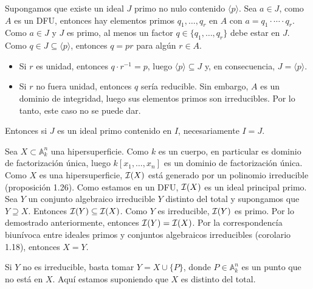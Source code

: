 \documentclass[twoside]{article}
\begin{document}
\begin{solucion}
Supongamos que existe un ideal $J$ primo no nulo contenido $\langle p \rangle$. Sea $a \in J$, como $A$ es un DFU, entonces hay elementos primos $q_1,\dots, q_r$ en $A$ con $a=q_1\cdot \cdots \cdot q_r$. Como $a \in J$ y $J$ es primo, al menos un factor $q \in \{q_1,\dots,q_r\}$ debe estar en $J$. Como $q \in J \subseteq \langle p\rangle$, entonces $q=pr$ para algún $r \in A$.
\begin{itemize}
	\item Si $r$ es unidad, entonces $q\cdot r^{-1} = p$, luego $\langle p \rangle \subseteq J$ y, en consecuencia, $J = \langle p \rangle$.
	\item Si $r$ no fuera unidad, entonces $q$ sería reducible. Sin embargo, $A$ es un dominio de integridad, luego sus elementos primos son irreducibles. Por lo tanto, este caso no se puede dar.
\end{itemize}
Entonces si $J$ es un ideal primo contenido en $I$, necesariamente $I = J$.

Sea $X \subset \mathbb{A}_k^n$ una hipersuperficie. Como $k$ es un cuerpo, en particular es dominio de factorización única, luego $k[x_1,\dots,x_n]$ es un dominio de factorización única. Como $X$ es una hipersuperficie, $\mathcal{I}(X)$ está generado por un polinomio irreducible (proposición 1.26). Como estamos en un DFU, $\mathcal{I}(X)$ es un ideal principal primo. Sea $Y$ un conjunto algebraico irreducible $Y$ distinto del total y supongamos que $Y \supseteq X$. Entonces $\mathcal{I}(Y) \subseteq \mathcal{I}(X)$. Como $Y$ es irreducible, $\mathcal{I}(Y)$ es primo. Por lo demostrado anteriormente, entonces $\mathcal{I}(Y) = \mathcal{I}(X)$. Por la correspondencía biunívoca entre ideales primos y conjuntos algebraicos irreducibles (corolario 1.18), entonces $X=Y$.

Si $Y$ no es irreducible, basta tomar $Y = X \cup \{P\}$, donde $P \in \mathbb{A}_k^n$ es un punto que no está en $X$. Aquí estamos suponiendo que $X$ es distinto del total.
\end{solucion}
\end{document}
